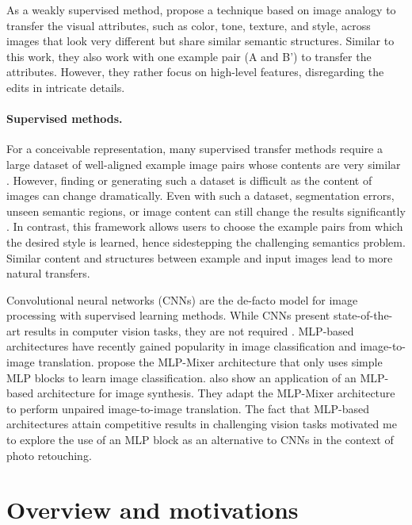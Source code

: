 As a weakly supervised method, \citeauthor{visual_attribute} \cite{visual_attribute} propose a technique based on image analogy \cite{Hertzmann01Image} to transfer the visual attributes, such as color, tone, texture, and style, across images that look very different but share similar semantic structures. Similar to this work, they also work with one example pair (A and B') to transfer the attributes. However, they rather focus on high-level features, disregarding the edits in intricate details.

\paragraph{Supervised methods.} 
For a conceivable representation, many supervised transfer methods require a large dataset of well-aligned example image pairs whose contents are very similar \cite{kim2021representative, wang2019underexposed}. However, finding or generating such a dataset is difficult as the content of images can change dramatically. Even with such a dataset, segmentation errors, unseen semantic regions, or image content can still change the results significantly \cite{10.1145/2790296}. In contrast, this framework allows users to choose the example pairs from which the desired style is learned, hence sidestepping the challenging semantics problem. Similar content and structures between example and input images lead to more natural transfers.


Convolutional neural networks (CNNs) are the de-facto model for image processing with supervised learning methods. While CNNs present state-of-the-art results in computer vision tasks, they are not required \cite{tolstikhin2021mlp}. MLP-based architectures have recently gained popularity in image classification and image-to-image translation. \citeauthor{cazenavette2021mixergan} \cite{cazenavette2021mixergan} propose the MLP-Mixer architecture that only uses simple MLP blocks to learn image classification. \citeauthor{cazenavette2021mixergan} \cite{cazenavette2021mixergan} also show an application of an MLP-based architecture for image synthesis. They adapt the MLP-Mixer architecture \cite{tolstikhin2021mlp} to perform unpaired image-to-image translation. The fact that MLP-based architectures attain competitive results in challenging vision tasks motivated me to explore the use of an MLP block as an alternative to CNNs in the context of photo retouching.

\section{Overview and motivations}
\label{chap:motivations}

